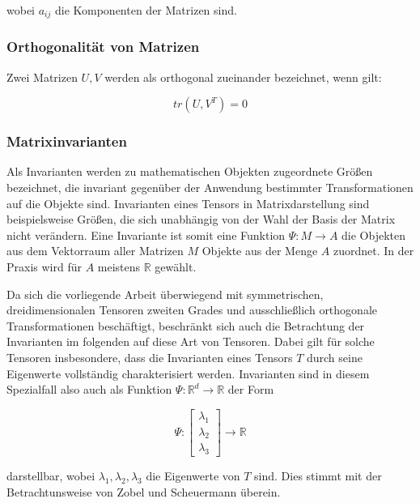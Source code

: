 \documentclass[a4paper,fontsize=12pt,toc=bib,halfparskip]{scrartcl}
\begin{document}
wobei $a_{ij}$ die Komponenten der Matrizen sind.

\subsubsection{Orthogonalit\"at von Matrizen}
Zwei Matrizen $U,V$ werden als orthogonal zueinander bezeichnet, wenn \cite{ennis2006orthogonal} gilt:

\begin{equation}
tr(U,V^{T}) = 0
\end{equation}

\subsubsection{Matrixinvarianten}
\label{Matrixinvarianten}
Als Invarianten werden zu mathematischen Objekten zugeordnete Gr\"o{\ss}en bezeichnet, die invariant gegen\"uber der Anwendung bestimmter Transformationen auf die Objekte sind. Invarianten eines Tensors in Matrixdarstellung sind beispielsweise Gr\"o{\ss}en, die sich unabh\"angig von der Wahl der Basis der Matrix nicht ver\"andern\cite{ennis2006orthogonal}. Eine Invariante ist somit eine Funktion $\Psi: M \rightarrow A$ die Objekten aus dem Vektorraum aller Matrizen $M$ Objekte aus der Menge $A$ zuordnet. In der Praxis wird f\"ur $A$ meistens $\mathbb{R}$ gew\"ahlt.

Da sich die vorliegende Arbeit \"uberwiegend mit symmetrischen, dreidimensionalen Tensoren zweiten Grades und ausschlie{\ss}lich orthogonale Transformationen besch\"aftigt, beschr\"ankt sich auch die Betrachtung der Invarianten im folgenden auf diese Art von Tensoren. Dabei gilt f\"ur solche Tensoren insbesondere, dass die Invarianten eines Tensors $T$ durch seine Eigenwerte vollst\"andig charakterisiert werden. Invarianten sind in diesem Spezialfall also auch als Funktion $\Psi: \mathbb{R}^d \rightarrow \mathbb{R}$ der Form

\begin{equation}
	\Psi:
	\begin{bmatrix}
	\lambda_1\\
	\lambda_2\\
	\lambda_3
	\end{bmatrix}
	\rightarrow \mathbb{R}
\end{equation}

darstellbar, wobei $\lambda_1, \lambda_2, \lambda_3$ die Eigenwerte von $T$ sind. Dies stimmt mit der Betrachtunsweise von Zobel und Scheuermann \cite{zobel2017extremal} \"uberein.
\end{document}
